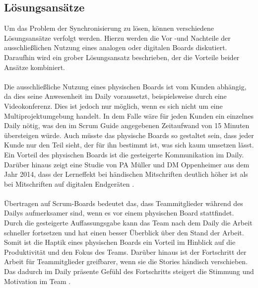 \documentclass[12pt,titlepage]{scrartcl}
\begin{document}
		\subsection{Lösungsansätze} \label{loesungsansaetze}
		Um das Problem der Synchronisierung zu lösen, können verschiedene Lösungsansätze verfolgt werden. Hierzu werden die Vor -und Nachteile der ausschließlichen Nutzung eines analogen oder digitalen Boards diskutiert. Daraufhin wird ein grober Lösungsansatz beschrieben, der die Vorteile beider Ansätze kombiniert. \\ \\
		Die ausschließliche Nutzung eines physischen Boards ist vom Kunden abhängig, da dies seine Anwesenheit im Daily voraussetzt, beispielsweise durch eine Videokonferenz. Dies ist jedoch nur möglich, wenn es sich nicht um eine Multiprojektumgebung handelt. In dem Falle wäre für jeden Kunden ein einzelnes Daily nötig, was den im Scrum Guide angegebenen Zeitaufwand von 15 Minuten übersteigen würde. Auch müsste das physische Boards so gestaltet sein, dass jeder Kunde nur den Teil sieht, der für ihn bestimmt ist, was sich kaum umsetzen lässt. Ein Vorteil des physischen Boards ist die gesteigerte Kommunikation im Daily. Darüber hinaus zeigt eine Studie von PA Müller und DM Oppenheimer aus dem Jahr 2014, dass der Lerneffekt bei händischen Mitschriften deutlich höher ist als bei Mitschriften auf digitalen Endgeräten \cite{pen}. \\ \\
		Übertragen auf Scrum-Boards bedeutet das, dass Teammitglieder während des Dailys aufmerksamer sind, wenn es vor einem physischen Board stattfindet. Durch die gesteigerte Auffassungsgabe kann das Team nach dem Daily die Arbeit schneller fortsetzen und hat einen besser Überblick über den Stand der Arbeit. Somit ist die Haptik eines physischen Boards ein Vorteil im Hinblick auf die Produktivität und den Fokus des Teams. Darüber hinaus ist der Fortschritt der Arbeit für Teammitglieder greifbarer, wenn sie die Stories händisch verschieben. Das dadurch im Daily präsente Gefühl des Fortschritts steigert die Stimmung und Motivation im Team \cite{progress}.\\ \\
\end{document}
